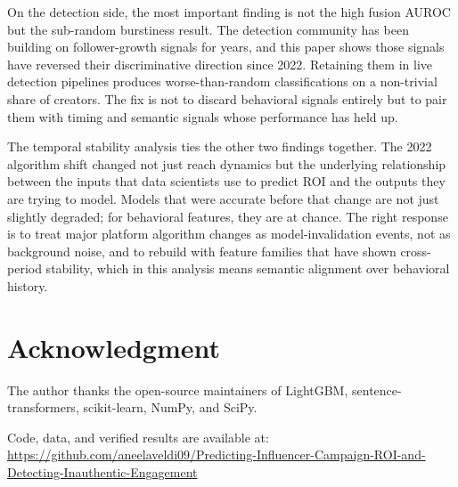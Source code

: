 \documentclass[conference]{IEEEtran}
\begin{document}
On the detection side, the most important finding is not the high fusion
AUROC but the sub-random burstiness result. The detection community has
been building on follower-growth signals for years, and this paper shows
those signals have reversed their discriminative direction since 2022.
Retaining them in live detection pipelines produces worse-than-random
classifications on a non-trivial share of creators. The fix is not to
discard behavioral signals entirely but to pair them with timing and
semantic signals whose performance has held up.

The temporal stability analysis ties the other two findings together.
The 2022 algorithm shift changed not just reach dynamics but the underlying
relationship between the inputs that data scientists use to predict ROI
and the outputs they are trying to model. Models that were accurate before
that change are not just slightly degraded; for behavioral features, they
are at chance. The right response is to treat major platform algorithm
changes as model-invalidation events, not as background noise, and to
rebuild with feature families that have shown cross-period stability,
which in this analysis means semantic alignment over behavioral history.

\section*{Acknowledgment}

The author thanks the open-source maintainers of LightGBM,
sentence-transformers, scikit-learn, NumPy, and SciPy.

Code, data, and verified results are available at:\\
\url{https://github.com/aneelaveldi09/Predicting-Influencer-Campaign-ROI-and-Detecting-Inauthentic-Engagement}
\end{document}

